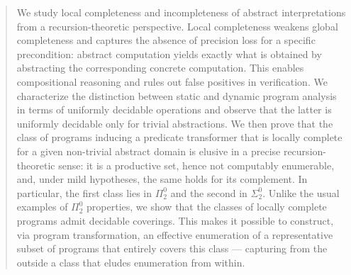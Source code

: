 \documentclass[runningheads]{llncs}
\begin{document}
\begin{abstract}
We study local completeness and incompleteness of abstract interpretations from a recursion-theoretic perspective. Local completeness weakens global completeness and captures the absence of precision loss for a specific precondition: abstract computation yields exactly what is obtained by abstracting the corresponding concrete computation. This enables compositional reasoning and rules out false positives in verification.
We characterize the distinction between static and dynamic program analysis in terms of uniformly decidable operations and observe that the latter is uniformly decidable only for trivial abstractions. We then prove that the class of programs inducing a predicate transformer that is locally complete for a given non-trivial abstract domain is elusive in a precise recursion-theoretic sense: it is a productive set, hence not computably enumerable, and, under mild hypotheses, the same holds for its complement. In particular, the first class lies in $\Pi^0_2$
and the second in $\Sigma^0_2$.
Unlike the usual examples of $\Pi^0_2$ properties, we show that the classes of locally complete programs admit decidable coverings. This makes it possible to construct, via program transformation, an effective enumeration of a representative subset of programs that entirely covers this class --- capturing from the outside a class that eludes enumeration from within.
\end{abstract}
\end{document}
